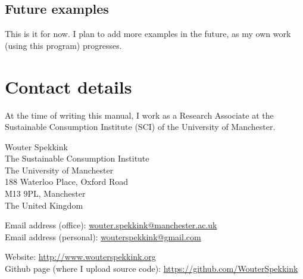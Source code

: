 \documentclass{memoir}
\begin{document}
\section{Future examples}
\label{sec:futureexamples}

This is it for now. I plan to add more examples in the future, as my own work (using this program) progresses. 


\chapter{Contact details}
\label{chap:contactdetails}

At the time of writing this manual, I work as a Research Associate at the Sustainable Consumption Institute (SCI) of the University of Manchester.

Wouter Spekkink \\
The Sustainable Consumption Institute \\
The University of Manchester \\
188 Waterloo Place, Oxford Road \\
M13 9PL, Manchester \\
The United Kingdom

Email address (office): \href{mailto:wouter.spekkink@manchester.ac.uk}{wouter.spekkink@manchester.ac.uk} \\
Email address (personal): \href{mailto:wouterspekkink@gmail.com}{wouterspekkink@gmail.com}

Website: \url{http://www.wouterspekkink.org} \\
Github page (where I upload source code): \url{https://github.com/WouterSpekkink}
\end{document}
